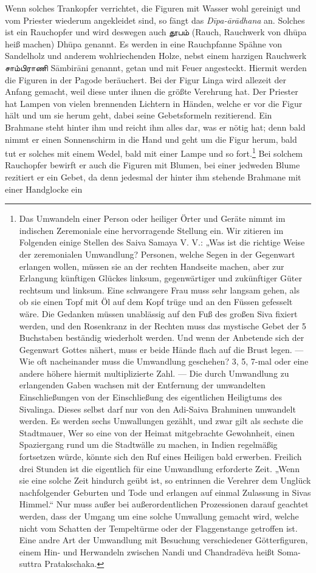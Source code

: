 \documentclass{article}
\newcommand{\TamilText}[1]{\texttamil{#1}}
\newcommand{\tam}[1]{\TamilText{#1}}
\begin{document}
Wenn solches Trankopfer verrichtet, die Figuren mit Wasser wohl gereinigt und vom Priester wiederum angekleidet sind, so fängt das \emph{D\={i}pa-\={a}r\={a}dhana} an. Solches ist ein Rauchopfer und wird deswegen auch \tam{தூபம்} (Rauch, Rauchwerk von dh\={u}pa heiß machen) Dh\={u}pa genannt. Es werden in eine Rauchpfanne Spähne von Sandelholz und anderem wohlriechenden Holze, nebst einem harzigen Rauchwerk \tam{சாம்பிராணி} S\={a}mbir\={a}ni genannt, getan und mit Feuer angesteckt. Hiermit werden die Figuren in der Pagode beräuchert. Bei der Figur Linga wird allezeit der Anfang gemacht, weil diese unter ihnen die größte Verehrung hat. Der Priester hat Lampen von vielen brennenden Lichtern in Händen, welche er vor die Figur hält und um sie herum geht, dabei seine Gebetsformeln rezitierend. Ein Brahmane steht hinter ihm und reicht ihm alles dar, was er nötig hat; denn bald nimmt er einen Sonnenschirm in die Hand und geht um die Figur herum, bald tut er solches mit einem Wedel, bald mit einer Lampe und so fort.\footnote{Das Umwandeln einer Person oder heiliger Örter und Geräte nimmt im indischen Zeremoniale eine hervorragende Stellung ein. Wir zitieren im Folgenden einige Stellen des Saiva Samaya V. V.: „Was ist die richtige Weise der zeremonialen Umwandlung? Personen, welche Segen in der Gegenwart erlangen wollen, müssen sie an der rechten Handseite machen, aber zur Erlangung künftigen Glückes linksum, gegenwärtiger und zukünftiger Güter rechtsum und linksum. Eine schwangere Frau muss sehr langsam gehen, als ob sie einen Topf mit Öl auf dem Kopf trüge und an den Füssen gefesselt wäre. Die Gedanken müssen unablässig auf den Fuß des großen Siva fixiert werden, und den Rosenkranz in der Rechten muss das mystische Gebet der 5 Buchstaben beständig wiederholt werden. Und wenn der Anbetende sich der Gegenwart Gottes nähert, muss er beide Hände flach auf die Brust legen. — Wie oft nacheinander muss die Umwandlung geschehen? 3, 5, 7-mal oder eine andere höhere hiermit multiplizierte Zahl. — Die durch Umwandlung zu erlangenden Gaben wachsen mit der Entfernung der umwandelten Einschließungen von der Einschließung des eigentlichen Heiligtums des Sivalinga. Dieses selbst darf nur von den Adi-Saiva Brahminen umwandelt werden. Es werden sechs Umwallungen gezählt, und zwar gilt als sechste die Stadtmauer, Wer so eine von der Heimat mitgebrachte Gewohnheit, einen Spaziergang rund um die Stadtwälle zu machen, in Indien regelmäßig fortsetzen würde, könnte sich den Ruf eines Heiligen bald erwerben. Freilich drei Stunden ist die eigentlich für eine Umwandlung erforderte Zeit. „Wenn sie eine solche Zeit hindurch geübt ist, so entrinnen die Verehrer dem Unglück nachfolgender Geburten und Tode und erlangen auf einmal Zulassung in Sivas Himmel.“ Nur muss außer bei außerordentlichen Prozessionen darauf geachtet werden, dass der Umgang um eine solche Umwallung gemacht wird, welche nicht vom Schatten der Tempeltürme oder der Flaggenstange getroffen ist. Eine andre Art der Umwandlung mit Besuchung verschiedener Götterfiguren, einem Hin- und Herwandeln zwischen Nandi und Chandrad\={e}va heißt Soma-suttra Pratakschaka.} Bei solchem Rauchopfer bewirft er auch die Figuren mit Blumen, bei einer jedweden Blume rezitiert er ein Gebet, da denn jedesmal der hinter ihm stehende Brahmane mit einer Handglocke ein 
\end{document}
